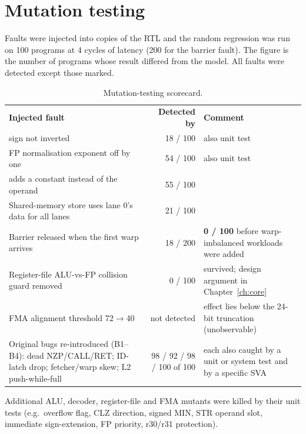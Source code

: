 \documentclass[10pt,a4paper]{report}
\newcommand{\ins}[1]{\texttt{\detokenize{#1}}}
\newcommand{\rowcol}{\rowcolors{2}{rowgray}{white}}
\newcommand{\tblhead}[1]{\cellcolor{hdrgray}\sffamily\bfseries #1}
\begin{document}
\section{Mutation testing}
Faults were injected into copies of the RTL and the random regression was run on 100 programs at 4 cycles of latency (200 for the barrier fault).
The figure is the number of programs whose result differed from the model. All faults were detected except those marked.
\begin{table}[ht]\centering\rowcol
\begin{tabular}{@{}p{7.3cm}rp{5.6cm}@{}}
\tblhead{Injected fault} & \tblhead{Detected by} & \tblhead{Comment}\\
\ins{FSUB} sign not inverted & 18 / 100 & also unit test\\
FP normalisation exponent off by one & 54 / 100 & also unit test\\
\ins{ATOM_ADD} adds a constant instead of the operand & 55 / 100 &\\
Shared-memory store uses lane 0's data for all lanes & 21 / 100 &\\
Barrier released when the first warp arrives & 18 / 200 & \textbf{0 / 100} before warp-imbalanced workloads were added\\
Register-file ALU-vs-FP collision guard removed & 0 / 100 & survived; design argument in Chapter~\ref{ch:core}\\
FMA alignment threshold 72$\rightarrow$40 & not detected & effect lies below the 24-bit truncation (unobservable)\\
\midrule
Original bugs re-introduced (B1--B4): dead NZP/CALL/RET; ID-latch drop; fetcher/warp skew; L2 push-while-full & 98 / 92 / 98 / 100 of 100 & each also caught by a unit or system test and by a specific SVA\\
\bottomrule
\end{tabular}
\caption{Mutation-testing scorecard.}
\end{table}
Additional ALU, decoder, register-file and FMA mutants were killed by their unit tests (e.g.\ overflow flag, CLZ direction, signed MIN, STR operand slot, immediate sign-extension, FP priority, r30/r31 protection).
\end{document}

